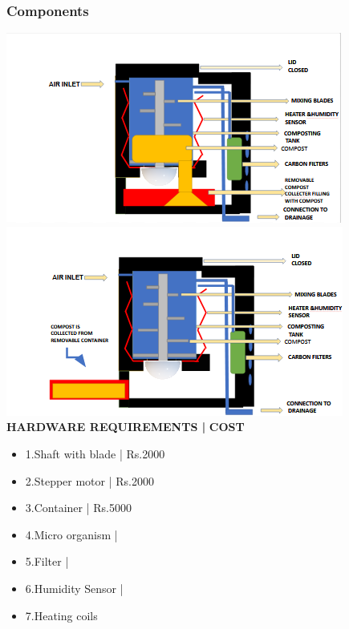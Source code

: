 \documentclass[11pt]{beamer}
\begin{document}
\begin{frame}
	\frametitle{Components}
	 \includegraphics[height=0.35\textheight]{image2.png}
	 \includegraphics[height=0.35\textheight]{image3.png}
	\\ \textbf{HARDWARE REQUIREMENTS |}
	\textbf{COST}
	\begin{itemize}
		\item1.Shaft with blade | Rs.2000
		\item2.Stepper motor | Rs.2000
		\item3.Container | Rs.5000
		\item4.Micro organism |
		\item5.Filter |
		\item6.Humidity Sensor |
		\item7.Heating coils
	\end{itemize}
\end{frame}
\end{document}
